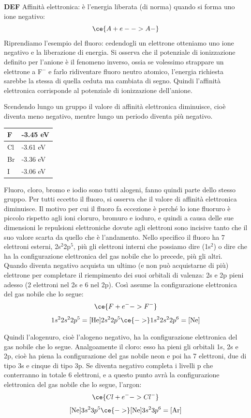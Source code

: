 \textbf{DEF} Affinità elettronica: è l'energia liberata (di norma) quando si forma uno ione negativo:
$$\ce{ A + e- -> A-}$$ 
Riprendiamo l'esempio del fluoro: cedendogli un elettrone otteniamo uno ione negativo e la liberazione di energia. Si osserva che il potenziale di ionizzazione definito per l'anione è il fenomeno inverso, ossia se volessimo strappare un elettrone a F$^-$ e farlo ridiventare fluoro neutro atomico, l'energia richiesta sarebbe la stessa di quella ceduta ma cambiata di segno. Quindi l'affinità elettronica corrisponde al potenziale di ionizzazione dell'anione.

Scendendo lungo un gruppo il valore di affinità elettronica diminuisce, cioè diventa meno negativo, mentre lungo un periodo diventa più negativo.
\begin{center}
    \begin{tabular}{ m{1cm}|m{2cm} } 
     F & -3.45 eV \\ 
     \hline
     Cl & -3.61 eV \\
     \hline
     Br & -3.36 eV \\ 
     \hline
     I & -3.06 eV \\
     \hline
    \end{tabular}
    \end{center}
Fluoro, cloro, bromo e iodio sono tutti alogeni, fanno quindi parte dello stesso gruppo. Per tutti eccetto il fluoro, si osserva che il valore di affinità elettronica diminuisce. Il motivo per cui il fluoro fa eccezione è perché lo ione fluoruro è piccolo rispetto agli ioni cloruro, bromuro e ioduro, e quindi a causa delle sue dimensioni le repulsioni elettroniche dovute agli elettroni sono incisive tanto che il suo valore scarta da quello che è l'andamento. Nello specifico il fluoro ha 7 elettroni esterni, 2s$^2$2p$^5$, più gli elettroni interni che possiamo dire (1s$^2$) o dire che ha la configurazione elettronica del gas nobile che lo precede, più gli altri. Quando diventa negativo acquista un ultimo (e non può acquistarne di più) elettrone per completare il riempimento dei suoi orbitali di valenza: 2s e 2p pieni adesso (2 elettroni nel 2s e 6 nel 2p). Così assume la configurazione elettronica del gas nobile che lo segue:
$$\ce{F + e^- -> F^-}$$
$$1s^22s^22p^5= \text{[He]}2s^22p^5\ce{->}1s^22s^22p^6=\text{[Ne]}$$

Quindi l'alogenuro, cioè l'alogeno negativo, ha la configurazione elettronica del gas nobile che lo segue. Analgoamente il cloro: esso ha pieni gli orbitali 1s, 2s e 2p, cioè ha piena la configurazione del gas nobile neon e poi ha 7 elettroni, due di tipo 3s e cinque di tipo 3p. Se diventa negativo completa i livelli p che conterranno in totale 6 elettroni, e a questo punto avrà la configurazione elettronica del gas nobile che lo segue, l'argon:
$$\ce{Cl + e^- -> Cl^-}$$
$$\text{[Ne]}3s^23p^5 \ce{->} \text{[Ne]}3s^23p^6=\text{[Ar]}$$

